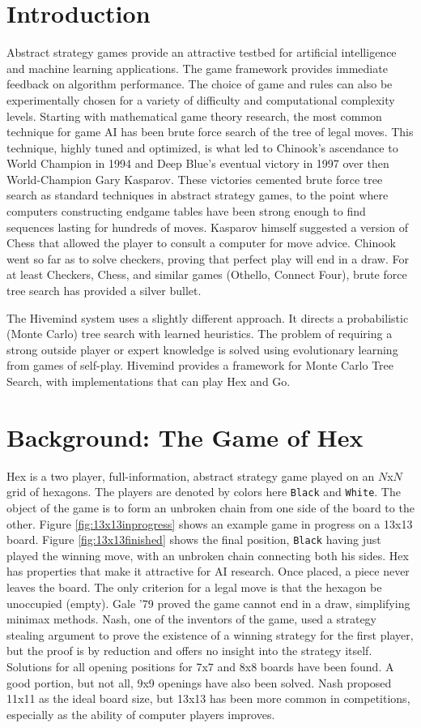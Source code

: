 \documentclass[11pt]{report}
\newcommand{\black}{\texttt{Black}}
\newcommand{\white}{\texttt{White}}
\begin{document}
\section{Introduction}
Abstract strategy games provide an attractive testbed for artificial intelligence and machine learning applications. The game framework provides immediate feedback on algorithm performance. The choice of game and rules can also be experimentally chosen for a variety of difficulty and computational complexity levels. Starting with mathematical game theory research, the most common technique for game AI has been brute force search of the tree of legal moves. This technique, highly tuned and optimized, is what led to Chinook's ascendance to World Champion in 1994 and Deep Blue's eventual victory in 1997 over then World-Champion Gary Kasparov. These victories cemented brute force tree search as standard techniques in abstract strategy games, to the point where computers constructing endgame tables have been strong enough to find sequences lasting for hundreds of moves. Kasparov himself suggested a version of Chess that allowed the player to consult a computer for move advice. Chinook went so far as to solve checkers, proving that perfect play will end in a draw. For at least Checkers, Chess, and similar games (Othello, Connect Four), brute force tree search has provided a silver bullet.

The Hivemind system uses a slightly different approach. It directs a probabilistic (Monte Carlo) tree search with learned heuristics. The problem of requiring a strong outside player or expert knowledge is solved using evolutionary learning from games of self-play. Hivemind provides a framework for Monte Carlo Tree Search, with implementations that can play Hex and Go.

\section{Background: The Game of Hex}
Hex is a two player, full-information, abstract strategy game played on an $N$x$N$ grid of hexagons. The players are denoted by colors here \black{} and \white. The object of the game is to form an unbroken chain from one side of the board to the other. Figure \ref{fig:13x13inprogress} shows an example game in progress on a 13x13 board. Figure \ref{fig:13x13finished} shows the final position, \black{} having just played the winning move, with an unbroken chain connecting both his sides. Hex has properties that make it attractive for AI research. Once placed, a piece never leaves the board. The only criterion for a legal move is that the hexagon be unoccupied (empty). Gale '79 proved the game cannot end in a draw, simplifying minimax methods. Nash, one of the inventors of the game, used a strategy stealing argument to prove the existence of a winning strategy for the first player, but the proof is by reduction and offers no insight into the strategy itself. Solutions for all opening positions for 7x7 and 8x8 boards have been found\cite{henderson2009solving}. A good portion, but not all, 9x9 openings have also been solved. Nash proposed 11x11 as the ideal board size, but 13x13 has been more common in competitions, especially as the ability of computer players improves.
\end{document}
